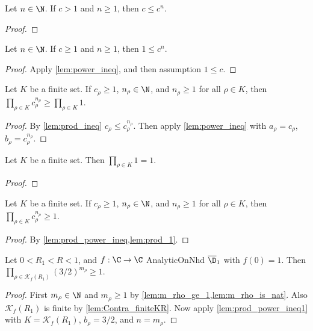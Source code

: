 \begin{lemma}\label{lem:power_ineq} \leanok
Let $n \in \N$. If $c > 1$ and $n \ge 1$, then $c \le c^n$.
\end{lemma}
\begin{proof} \leanok
\end{proof}

\begin{lemma}\label{lem:power_ineq_1}\leanok
Let $n \in \N$. If $c \ge 1$ and $n \ge 1$, then $1 \le c^n$.
\end{lemma}
\begin{proof} \leanok
{}
Apply \cref{lem:power_ineq}, and then assumption $1 \le c$.
\end{proof}

\begin{lemma}\label{lem:prod_power_ineq}  \leanok
Let $K$ be a finite set. If $c_{\rho} \ge 1$, $n_\rho \in \N$, and $n_{\rho} \ge 1$ for all $\rho\in K$, then $\prod_{\rho\in K} c_{\rho}^{n_{\rho}} \ge \prod_{\rho\in K} 1$.
\end{lemma}
\begin{proof} \leanok
{}
By \cref{lem:prod_ineq} $c_{\rho} \le c_{\rho}^{n_\rho}$. Then apply \cref{lem:power_ineq} with $a_{\rho}=c_{\rho}$, $b_{\rho}=c_{\rho}^{n_\rho}$.
\end{proof}


\begin{lemma}\label{lem:prod_1} \leanok
Let $K$ be a finite set. Then $\prod_{\rho\in K} 1=1$.
\end{lemma}
\begin{proof} \leanok
\end{proof}

\begin{lemma}\label{lem:prod_power_ineq1}  \leanok
Let $K$ be a finite set. If $c_{\rho} \ge 1$, $n_\rho \in \N$, and $n_{\rho} \ge 1$ for all $\rho\in K$, then $\prod_{\rho\in K} c_{\rho}^{n_{\rho}} \ge 1$.
\end{lemma}
\begin{proof} \leanok
{}
By \cref{lem:prod_power_ineq,lem:prod_1}.
\end{proof}


\begin{lemma}\label{lem:mod_lower_bound_1}  \leanok
Let $0<R_1<R<1$, and $f:\C\to\C$ AnalyticOnNhd $\overline{\D}_1$ with $f(0)=1$. Then $\prod_{\rho\in\mathcal K_f(R_1)}(3/2)^{m_\rho} \ge 1$.
\end{lemma}
\begin{proof} \leanok
{}
First $m_\rho\in\N$ and $m_\rho\ge1$ by \cref{lem:m_rho_ge_1,lem:m_rho_is_nat}. Also $\mathcal K_f(R_1)$ is finite by \cref{lem:Contra_finiteKR}. Now apply \cref{lem:prod_power_ineq1} with $K=\mathcal K_f(R_1)$, $b_\rho=3/2$, and $n=m_\rho$.
\end{proof}

